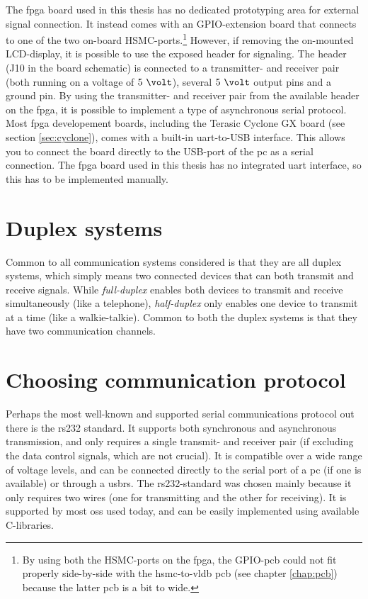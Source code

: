 \documentclass[main.tex]{subfiles}
\begin{document}
The \gls{fpga} board used in this thesis has no dedicated prototyping area for external signal connection. It instead comes with an GPIO-extension board that connects to one of the two on-board HSMC-ports.\footnote{By using both the HSMC-ports on the \gls{fpga}, the GPIO-\gls{pcb} could not fit properly side-by-side with the \acrshort{hsmc}-to-\acrshort{vldb} \acrshort{pcb} (see chapter \ref{chap:pcb}) because the latter \gls{pcb} is a bit to wide.} However, if removing the on-mounted LCD-display, it is possible to use the exposed header for signaling. The header (J10 in the board schematic) is connected to a transmitter- and receiver pair (both running on a voltage of $5~\volt$), several $5~\volt$ output pins and a ground pin. By using the transmitter- and receiver pair from the available header on the \gls{fpga}, it is possible to implement a type of asynchronous serial protocol. Most \gls{fpga} developement boards, including the Terasic Cyclone GX board (see section \ref{sec:cyclone}), comes with a built-in \gls{uart}-to-USB interface. This allows you to connect the board directly to the USB-port of the \acrshort{pc} as a serial connection. The \gls{fpga} board used in this thesis has no integrated \gls{uart} interface, so this has to be implemented manually.

\section{Duplex systems}

Common to all communication systems considered is that they are all duplex systems, which simply means two connected devices that can both transmit and receive signals. While \textit{full-duplex} enables both devices to transmit and receive simultaneously (like a telephone), \textit{half-duplex} only enables one device to transmit at a time (like a walkie-talkie). Common to both the duplex systems is that they have two communication channels. 

\section{Choosing communication protocol}
Perhaps the most well-known and supported serial communications protocol out there is the \acrshort{rs232} standard. It supports both synchronous and asynchronous transmission, and only requires a single transmit- and receiver pair (if excluding the data control signals, which are not crucial). It is compatible over a wide range of voltage levels, and can be connected directly to the serial port of a \acrshort{pc} (if one is available) or through a \gls{usbrs}. The \acrshort{rs232}-standard was chosen mainly because it only requires two wires (one for transmitting and the other for receiving). It is supported by most \glspl{os} used today, and can be easily implemented using available C-libraries.\\
\end{document}
